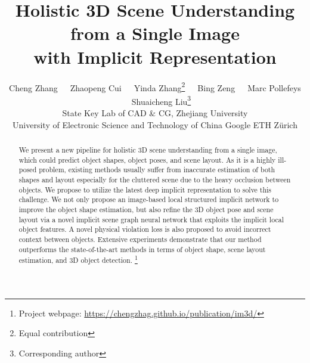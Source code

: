 \documentclass[final]{cvpr}
\newcommand\blfootnote[1]{\begingroup
  \renewcommand\thefootnote{}\footnote{#1}\addtocounter{footnote}{-1}\endgroup
}
\begin{document}
\title{Holistic 3D Scene Understanding from a Single Image \\ with Implicit Representation }
\author{
    Cheng Zhang\ \ \ Zhaopeng Cui\ \ \ Yinda Zhang\thanks{Equal contribution}\ \ \ Bing Zeng\ \ \ Marc Pollefeys \ \ \ Shuaicheng Liu\thanks{Corresponding author}\\
 State Key Lab of CAD \& CG, Zhejiang University \\
     University of Electronic Science and Technology of China \quad
     Google \quad ETH Z\"{u}rich \\
}


\maketitle

\begin{abstract}
We present a new pipeline for holistic 3D scene understanding from a single image, which could predict object shapes, object poses, and scene layout. As it is a highly ill-posed problem, existing methods usually suffer from inaccurate estimation of both shapes and layout especially for the cluttered scene due to the heavy occlusion between objects. We propose to utilize the latest deep implicit representation to solve this challenge. 
We not only propose an image-based local structured implicit network to improve the object shape estimation, but also refine the 3D object pose and scene layout via a novel implicit scene graph neural network that exploits the implicit local object features.
A novel physical violation loss is also proposed to avoid incorrect context between objects. Extensive experiments demonstrate that our method outperforms the state-of-the-art methods in terms of object shape, scene layout estimation, and 3D object detection.\blfootnote{Project webpage:
\href{https://chengzhag.github.io/publication/im3d/}{https://chengzhag.github.io/publication/im3d/}}
   
\end{abstract}
\end{document}

